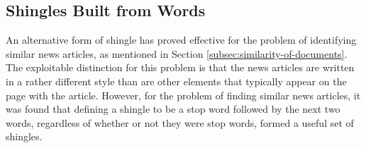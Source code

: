 \subsection{Shingles Built from Words}\label{subsec:shingles-built-from-words}

An alternative form of shingle has proved effective for the problem of identifying similar news articles, as mentioned in Section \ref{subsec:similarity-of-documents}. The exploitable distinction for this problem is that the news articles are written in a rather different style than are other elements that typically appear on the page with the article. However, for the problem of finding similar news articles, it was found that defining a shingle to be a stop word followed by the next two words, regardless of whether or not they were stop words, formed a useful set of shingles. 















